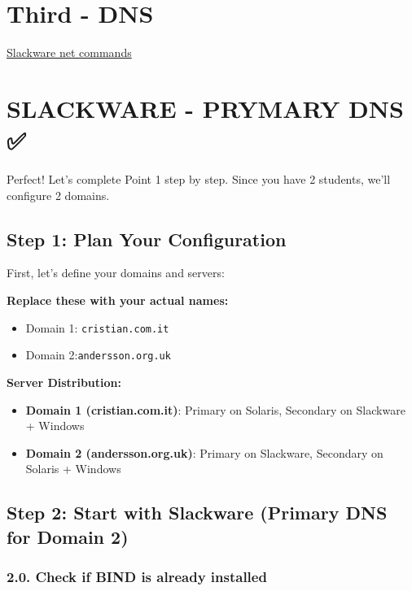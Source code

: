 \section{Third - DNS}\label{third---dns}

\href{Third\%20-\%20DNS\%20263f56fc503e80ddb361c216e75fd3bf/Slackware\%20net\%20commands\%20264f56fc503e8085bd88d9584832e069.md}{Slackware
net commands}

\section{SLACKWARE - PRYMARY DNS ✅}\label{slackware---prymary-dns}

Perfect! Let's complete Point 1 step by step. Since you have 2 students,
we'll configure 2 domains.

\subsection{Step 1: Plan Your
Configuration}\label{step-1-plan-your-configuration}

First, let's define your domains and servers:

\textbf{Replace these with your actual names:}

\begin{itemize}
\tightlist
\item
  Domain 1: \texttt{cristian.com.it}
\item
  Domain 2:\texttt{andersson.org.uk}
\end{itemize}

\textbf{Server Distribution:}

\begin{itemize}
\tightlist
\item
  \textbf{Domain 1 (cristian.com.it)}: Primary on Solaris, Secondary on
  Slackware + Windows
\item
  \textbf{Domain 2 (andersson.org.uk)}: Primary on Slackware, Secondary
  on Solaris + Windows
\end{itemize}

\subsection{Step 2: Start with Slackware (Primary DNS for Domain
2)}\label{step-2-start-with-slackware-primary-dns-for-domain-2}

\subsubsection{2.0. Check if BIND is already
installed}\label{check-if-bind-is-already-installed}

